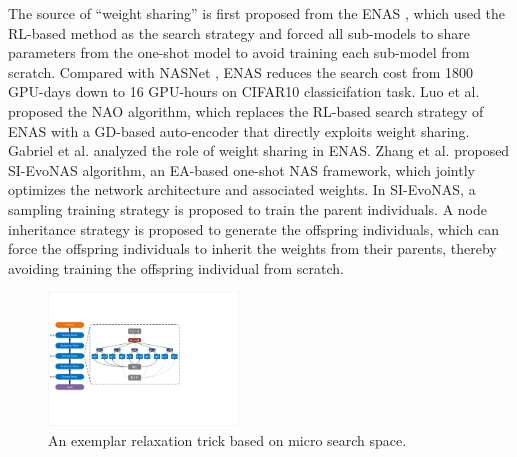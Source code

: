 \documentclass[journal]{IEEEtran}
\begin{document}
The source of “weight sharing” is first proposed from the ENAS \cite{pham2018efficient}, which used the RL-based method as the search strategy and forced all sub-models to share parameters from the one-shot model to avoid training each sub-model from scratch. Compared with NASNet \cite{zoph2018learning}, ENAS reduces the search cost from 1800 GPU-days down to 16 GPU-hours on CIFAR10 classicifation task. Luo et al. \cite{luo2018neural} proposed the NAO algorithm, which replaces the RL-based search strategy of ENAS \cite{pham2018efficient} with a GD-based auto-encoder that directly exploits weight sharing. Gabriel et al. \cite{bender2018understanding} analyzed the role of weight sharing in ENAS. Zhang et al. \cite{zhang2020efficient} proposed SI-EvoNAS algorithm, an EA-based one-shot NAS framework, which jointly optimizes the network architecture and associated weights. In SI-EvoNAS, a sampling training strategy is proposed to train the parent individuals. A node inheritance strategy is proposed to generate the offspring individuals, which can force the offspring individuals to inherit the weights from their parents, thereby avoiding training the offspring individual from scratch. 

\begin{figure}[H]
\centering %
\includegraphics[width=0.45\textwidth]{5.pdf} %
\caption{An exemplar relaxation trick based on micro search space.} %
\label{Fig_5}
\end{figure}
\end{document}
